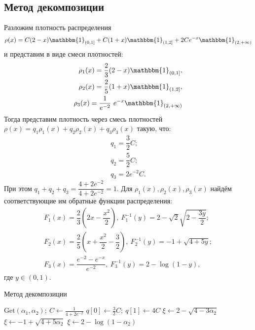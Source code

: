 \documentclass[specialist,
substylefile = spbu_report.rtx,
subf,href,colorlinks=true, 12pt]{disser}
\begin{document}
	\subsection{Метод декомпозиции}
	Разложим плотность распределения
	\begin{align*}
		\rho(x)=C(2-x)\mathbbm{1}_{(0,1]} + C(1+x)\mathbbm{1}_{(1,2]} + 2Ce^{-x}\mathbbm{1}_{(2,+\infty)}
	\end{align*}
	и представим в виде смеси плотностей:
	\begin{align*}
		\rho_1(x)=\dfrac{2}{3}(2-x)\mathbbm{1}_{(0,1]},\\
		\rho_2(x)=\dfrac{2}{5}(1+x)\mathbbm{1}_{(1,2]},\\
		\rho_3(x)=\dfrac{1}{e^{-2}}~e^{-x}\mathbbm{1}_{(2,+\infty)}
	\end{align*}
	Тогда представим плотность через смесь плотностей $\rho(x)=q_1\rho_1(x)+q_2\rho_2(x)+q_3\rho_3(x)$ такую, что:
	\begin{align*}
		q_1=\dfrac{3}{2}C;\\
		q_2=\dfrac{5}{2}C;\\
		q_3=2e^{-2}C.
	\end{align*}
	При этом $q_1 + q_2 + q_3 = \dfrac{4+2e^{-2}}{4+2e^{-2}}=1$. Для $\rho_1(x),\rho_2(x),\rho_3(x)$ найдём соответствующие им обратные функции распределения:
	\begin{align*}
		F_1(x)=\dfrac{2}{3}(2x-\dfrac{x^2}{2}),~F_1^{-1}(y)=2-\sqrt{2}\sqrt{2 - \dfrac{3y}{2}};\\
		F_2(x)=\dfrac{2}{5}(x+\dfrac{x^2}{2}-\dfrac{3}{2}),~F_2^{-1}(y)=-1+\sqrt{4+5y};\\
		F_3(x)=\dfrac{e^{-2}-e^{-x}}{e^{-2}},~F_3^{-1}(y)=2 -\log(1-y),
	\end{align*}
	где $y\in(0,1)$.
	\begin{algorithm}[h]
		\caption{Метод декомпозиции}
	\begin{algorithmic}[1]
		\State $\mathrm{Get}(\alpha_1, \alpha_2);~C\gets\frac{1}{4+2e^{-2}}$
		\State $q[0]\gets\frac{3}{2}C;~q[1]\gets4C$
		\State $\xi\gets2-\sqrt{4 - 3\alpha_2}$
		\State $\xi\gets-1+\sqrt{4+5\alpha_2}$
		\Else
		\State $\xi\gets2 -\log(1-\alpha_2)$
		\EndIf
	\end{algorithmic}
	\end{algorithm}
\end{document}
